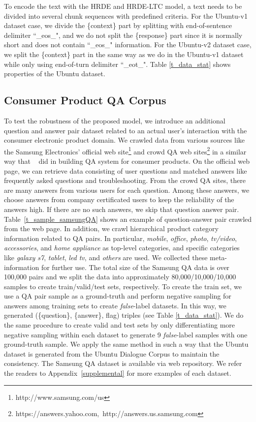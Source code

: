 \documentclass[11pt,a4paper]{article}
\begin{document}
To encode the text with the HRDE and HRDE-LTC model, a text needs to be divided into several chunk sequences with predefined criteria.
For the Ubuntu-v1 dataset case, we divide the \{context\} part by splitting with  end-of-sentence delimiter ``\_eos\_", and we do not split the \{response\} part since it is normally short and does not contain ``\_eos\_" information. For the Ubuntu-v2 dataset case, we split the \{context\} part in the same way as we do in the Ubuntu-v1 dataset while only using end-of-turn delimiter ``\_eot\_". Table \ref{t_data_stat} shows properties of the Ubuntu dataset.


\subsection{Consumer Product QA Corpus}
To test the robustness of the proposed model, we introduce an additional question and answer pair dataset related to an actual user's interaction with the consumer electronic product domain. 
We crawled data from various sources like the Samsung Electronics' official web site\footnote{http://www.samsung.com/us} and crowd QA web sites\footnote{https://answers.yahoo.com,~http://answers.us.samsung.com} in a similar way that ~\cite{yoon2016automatic} did in building QA system for consumer products.
On the official web page, we can retrieve data consisting of user questions and matched answers like frequently asked questions and troubleshooting.
From the crowd QA sites, there are many answers from various users for each question. 
Among these answers, we choose answers from company certificated users to keep the reliability of the answers high.
If there are no such answers, we skip that question answer pair. 
Table~\ref{t_sample_samsungQA} shows an example of question-answer pair crawled from the web page.
In addition, we crawl hierarchical product category information related to QA pairs. In particular, \textit{mobile}, \textit{office}, \textit{photo}, \textit{tv/video}, \textit{accessories}, and \textit{home appliance} as top-level categories, and specific categories like \textit{galaxy s7}, \textit{tablet}, \textit{led tv}, and \textit{others} are used. We collected these meta-information for further use. 
The total size of the Samsung QA data is over 100,000 pairs and we split the data into approximately 80,000/10,000/10,000 samples to create train/valid/test sets, respectively. 
To create the train set, we use a QA pair sample as a ground-truth and perform negative sampling for answers among training sets to create \textit{false}-label datasets.  In this way, we generated (\{question\}, \{answer\}, flag) triples  (see Table \ref{t_data_stat}). 
We do the same procedure to create valid and test sets by only differentiating more negative sampling within each dataset to generate 9 \textit{false}-label samples with one ground-truth sample. We apply the same method in such a way that the Ubuntu dataset is generated from the Ubuntu Dialogue Corpus to maintain the consistency.
The Samsung QA dataset is available via web repository.
We refer the readers to Appendix~\ref{supplemental} for more examples of each dataset.
\end{document}
